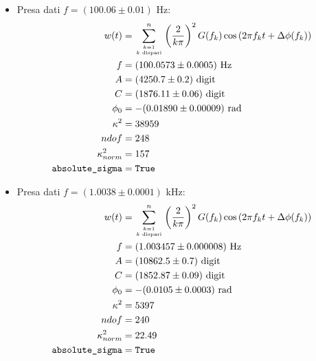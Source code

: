 \documentclass{article}[a4paper, oneside,11pt]
\begin{document}
    \begin{itemize}
        \item Presa dati $f=(100.06\pm0.01)$ Hz:
        \begin{align*}
            w(t) &= \sum_{{k=1}\atop{k \text{ dispari}}}^n \left(\frac{2}{k\pi}\right)^2 G(f_k) \cos\left(2\pi f_k t + \Delta\phi(f_k)\right)\\
            f &=  (100.0573 \pm 0.0005) \text{ Hz}\\
            A &=  (4250.7 \pm 0.2) \text{ digit} \\
            C &=  (1876.11 \pm 0.06) \text{ digit} \\
            \phi_0 &=  -(0.01890 \pm 0.00009) \text{ rad} \\
            \kappa^2 &=  38959 \\
            ndof &=  248 \\
            \kappa^2_{norm} &= 157\\
            \texttt{absolute\_sigma} &= \texttt{True}
        \end{align*}
           
        \item Presa dati $f=(1.0038\pm0.0001)$ kHz:
        \begin{align*}
            w(t) &= \sum_{{k=1}\atop{k \text{ dispari}}}^n \left(\frac{2}{k\pi}\right)^2 G(f_k) \cos\left(2\pi f_k t + \Delta\phi(f_k)\right)\\
            f &=  (1.003457 \pm 0.000008) \text{ Hz} \\
            A &=  (10862.5 \pm 0.7)\text{ digit} \\
            C &=  (1852.87 \pm 0.09) \text{ digit} \\
            \phi_0 &=  -(0.0105 \pm 0.0003) \text{ rad} \\
            \kappa^2 &=  5397\\
            ndof &=  240 \\
            \kappa^2_{norm} &= 22.49\\
            \texttt{absolute\_sigma} &= \texttt{True}
        \end{align*}
    \end{itemize}
\end{document}
